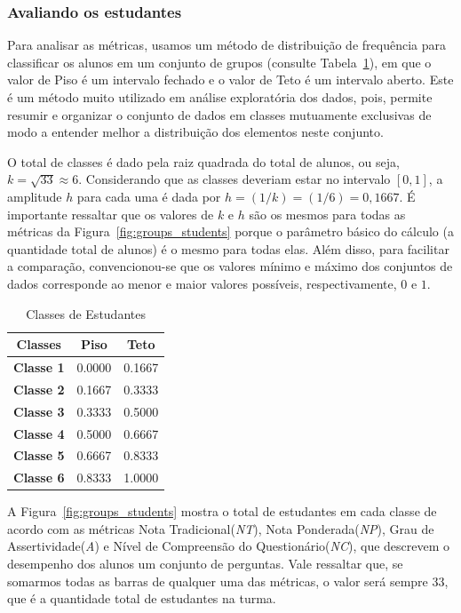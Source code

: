 \subsubsection{Avaliando os estudantes}
Para analisar as métricas, usamos um método de distribuição de frequência para classificar os alunos em um conjunto de grupos (consulte Tabela~\ref{tab:Groups}), em que o valor de Piso é um intervalo fechado e o valor de Teto é um intervalo aberto. Este é um método muito utilizado em análise exploratória dos dados, pois, permite resumir e organizar o conjunto de dados em classes mutuamente exclusivas de modo a entender melhor a distribuição dos elementos neste conjunto.

O total de classes é dado pela raiz quadrada do total de alunos, ou seja, $k = \sqrt{33} \approx 6$. Considerando que as classes deveriam estar no intervalo $[0,1]$, a amplitude $h$ para cada uma é dada por $h = (1/k) = (1/6) = 0,1667$. É importante ressaltar que os valores de $k$ e $h$ são os mesmos para todas as métricas da Figura~\ref{fig:groups_students} porque o parâmetro básico do cálculo (a quantidade total de alunos) é o mesmo para todas elas. Além disso, para facilitar a comparação, convencionou-se que os valores mínimo e máximo dos conjuntos de dados corresponde ao menor e maior valores possíveis, respectivamente, $0$ e $1$.

\begin{table}[htbp]
\caption{Classes de Estudantes}
\centering
\begin{tabular}{|c|c|c|}
\hline
\multicolumn{1}{|c|}{\textbf{Classes}} & \multicolumn{1}{c|}{\textbf{Piso}} & \multicolumn{1}{c|}{\textbf{Teto}} \\ \hline
\textbf{Classe 1} & 0.0000 & 0.1667 \\ \hline
\textbf{Classe 2} & 0.1667 & 0.3333 \\ \hline
\textbf{Classe 3} & 0.3333 & 0.5000 \\ \hline
\textbf{Classe 4} & 0.5000 & 0.6667 \\ \hline
\textbf{Classe 5} & 0.6667 & 0.8333 \\ \hline
\textbf{Classe 6} & 0.8333 & 1.0000 \\ \hline
\end{tabular}
\label{tab:Groups}
\end{table}

A Figura~\ref{fig:groups_students} mostra o total de estudantes em cada classe de acordo com as métricas Nota Tradicional(\textit{NT}), Nota Ponderada(\textit{NP}), Grau de Assertividade(\textit{A}) e Nível de Compreensão do Questionário(\textit{NC}), que descrevem o desempenho dos alunos um conjunto de perguntas. Vale ressaltar que, se somarmos todas as barras de qualquer uma das métricas, o valor será sempre 33, que é a quantidade total de estudantes na turma.

